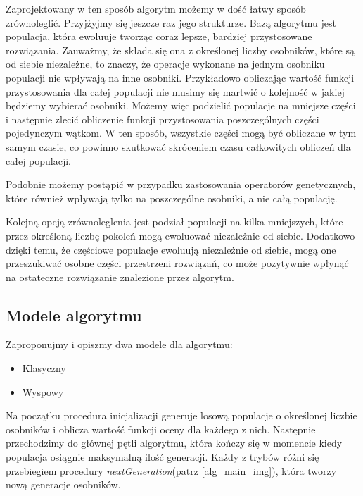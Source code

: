 Zaprojektowany w ten sposób algorytm możemy w dość łatwy sposób zrównoleglić. Przyjżyjmy się jeszcze raz jego strukturze. Bazą algorytmu jest 
populacja, która ewoluuje tworząc coraz lepsze, bardziej przystosowane rozwiązania. Zauważmy, że składa się ona z określonej liczby osobników, 
które są od siebie niezależne, to znaczy, że operacje wykonane na jednym osobniku populacji nie wpływają na inne osobniki. Przykładowo 
obliczając wartość funkcji przystosowania dla całej populacji nie musimy się martwić o kolejność w jakiej będziemy wybierać osobniki. Możemy więc 
podzielić populacje na mniejsze części i następnie zlecić obliczenie funkcji przystosowania poszczególnych części pojedynczym wątkom. W ten 
sposób, wszystkie części mogą być obliczane w tym samym czasie, co powinno skutkować skróceniem czasu całkowitych obliczeń dla całej populacji.

Podobnie możemy postąpić w przypadku zastosowania operatorów genetycznych, które również wpływają tylko na poszczególne osobniki, a nie całą 
populację.

Kolejną opcją zrównoleglenia jest podział populacji na kilka mniejszych, które przez określoną liczbę pokoleń mogą ewoluować niezależnie 
od siebie. Dodatkowo dzięki temu, że częściowe populacje ewoluują niezależnie od siebie, mogą one przeszukiwać osobne części przestrzeni 
rozwiązań, co może pozytywnie wpłynąć na ostateczne rozwiązanie znalezione przez algorytm\cite{ISLAND-MODEL-PERFORMANCE}.


\subsection{Modele algorytmu}

Zaproponujmy i opiszmy dwa modele dla algorytmu:
\begin{itemize}
    \item Klasyczny
    \item Wyspowy
\end{itemize}

Na początku procedura inicjalizacji generuje losową populacje o określonej liczbie osobników i oblicza wartość funkcji oceny dla każdego z nich. 
Następnie przechodzimy do głównej pętli algorytmu, która kończy się w momencie kiedy populacja osiągnie maksymalną ilość generacji. 
Każdy z trybów różni się przebiegiem procedury \textit{nextGeneration}(patrz \ref{alg_main_img}), która tworzy nową generacje osobników.

\newpage

